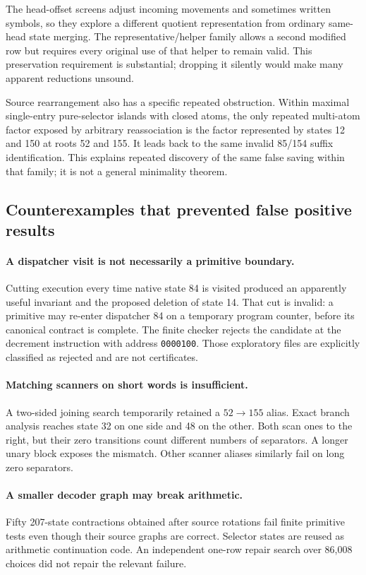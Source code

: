 \documentclass[11pt,a4paper]{article}
\newcommand{\code}[1]{\texttt{#1}}
\begin{document}
The head-offset screens adjust incoming movements and sometimes written
symbols, so they explore a different quotient representation from ordinary
same-head state merging. The representative/helper family allows a second
modified row but requires every original use of that helper to remain valid.
This preservation requirement is substantial; dropping it silently would
make many apparent reductions unsound.

Source rearrangement also has a specific repeated obstruction. Within
maximal single-entry pure-selector islands with closed atoms, the only
repeated multi-atom factor exposed by arbitrary reassociation is the factor
represented by states 12 and 150 at roots 52 and 155. It leads back to the
same invalid 85/154 suffix identification. This explains repeated discovery
of the same false saving within that family; it is not a general minimality
theorem.

\subsection{Counterexamples that prevented false positive results}

\paragraph{A dispatcher visit is not necessarily a primitive boundary.}
Cutting execution every time native state 84 is visited produced an
apparently useful invariant and the proposed deletion of state 14. That
cut is invalid: a primitive may re-enter dispatcher 84 on a temporary program
counter, before its canonical contract is complete. The finite checker
rejects the candidate at the decrement instruction with address
\code{0000100}. Those exploratory files are explicitly classified as
rejected and are not certificates.

\paragraph{Matching scanners on short words is insufficient.}
A two-sided joining search temporarily retained a $52\to155$ alias. Exact
branch analysis reaches state 32 on one side and 48 on the other. Both scan
ones to the right, but their zero transitions count different numbers of
separators. A longer unary block exposes the mismatch. Other scanner aliases
similarly fail on long zero separators.

\paragraph{A smaller decoder graph may break arithmetic.}
Fifty 207-state contractions obtained after source rotations fail finite
primitive tests even though their source graphs are correct. Selector states
are reused as arithmetic continuation code. An independent one-row repair
search over 86,008 choices did not repair the relevant failure.
\end{document}
